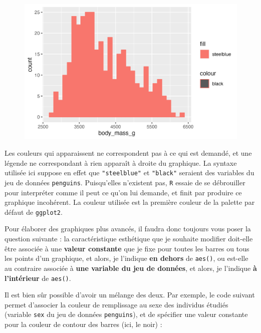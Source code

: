 \documentclass[
  letterpaper,
  DIV=11,
  numbers=noendperiod]{scrreprt}
\begin{document}
\begin{figure}[H]

{\centering \includegraphics{./03-visualization_files/figure-pdf/unnamed-chunk-11-1.png}

}

\end{figure}

Les couleurs qui apparaissent ne correspondent pas à ce qui est demandé,
et une légende ne correspondant à rien apparaît à droite du graphique.
La syntaxe utilisée ici suppose en effet que \texttt{"steelblue"} et
\texttt{"black"} seraient des variables du jeu de données
\texttt{penguins}. Puisqu'elles n'existent pas, \texttt{R} essaie de se
débrouiller pour interpréter comme il peut ce qu'on lui demande, et
finit par produire ce graphique incohérent. La couleur utilisée est la
première couleur de la palette par défaut de \texttt{ggplot2}.

Pour élaborer des graphiques plus avancés, il faudra donc toujours vous
poser la question suivante : la caractéristique esthétique que je
souhaite modifier doit-elle être associée à une \textbf{valeur
constante} que je fixe pour toutes les barres ou tous les points d'un
graphique, et alors, je l'indique \textbf{en dehors} de \texttt{aes()},
ou est-elle au contraire associée à \textbf{une variable du jeu de
données}, et alors, je l'indique \textbf{à l'intérieur} de
\texttt{aes()}.

Il est bien sûr possible d'avoir un mélange des deux. Par exemple, le
code suivant permet d'associer la couleur de remplissage au sexe des
individus étudiés (variable \texttt{sex} du jeu de données
\texttt{penguins}), et de spécifier une valeur constante pour la couleur
de contour des barres (ici, le noir) :
\end{document}
